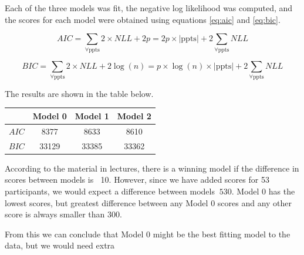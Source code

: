 \documentclass[12pt]{article}
\newtheorem*{theorem}{Theorem}
\begin{document}
Each of the three models was fit, the negative log likelihood was computed, and the scores for each model were obtained using equations \ref{eq:aic} and \ref{eq:bic}.

\begin{equation}
\label{eq:aic}
AIC = \sum_{\forall \mathrm{ppts}} 2 \times NLL + 2 p = 2 p \times |\mathrm{ppts}|  + 2 \sum_\mathrm{\forall \mathrm{ppts}} NLL
\end{equation}

\begin{equation}
BIC = \sum_{\forall \mathrm{ppts}} 2 \times NLL + 2 \log(n) =  p \times \log(n) \times |\mathrm{ppts}|  + 2 \sum_\mathrm{\forall \mathrm{ppts}} NLL
\label{eq:bic}
\end{equation}

The results are shown in the table below.


\begin{center}
 \begin{tabular}{|c || c | c | c |} 
 \hline
  & Model 0 & Model 1 & Model 2  \\ [0.5ex] 
 \hline\hline
 $AIC$ & 8377 & 8633 & 8610 \\
 \hline
 $BIC$ & 33129 & 33385 & 33362 \\ [1ex] 
 \hline
\end{tabular}
\end{center}

According to the material in lectures, there is a winning model if the difference in scores between models is $\>$ 10. However, since we have added scores for 53 participants, we would expect a difference between models $\> 530$. Model 0 has the lowest scores, but greatest difference between any Model 0 scores and any other score is always smaller than 300. 

From this we can conclude that Model 0 might be the best fitting model to the data, but we would need extra 





\newpage



\end{document}

